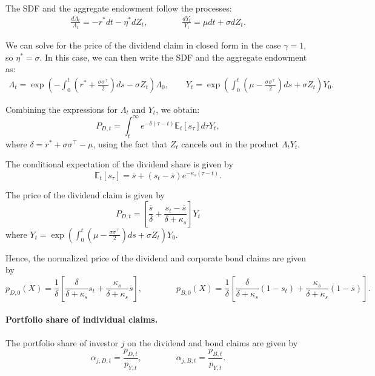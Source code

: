 The SDF and the aggregate endowment follow the processes:
\begin{align}
    \frac{d \Lambda_t}{\Lambda_t} = -r^* dt - \eta^* dZ_t, \qquad \qquad 
    \frac{d Y_t}{Y_t} = \mu dt + \sigma dZ_t.
\end{align}

We can solve for the price of the dividend claim in closed form in the case $\gamma = 1$, so $\eta^ * = \sigma$.
In this case, we can then write the SDF and the aggregate endowment as:
\begin{align}
    \Lambda_t = \exp\left( -\int_0^t \left( r^* + \frac{\sigma \sigma^\top}{2} \right) ds - \sigma Z_t \right) \Lambda_0, \qquad 
    Y_t = \exp\left( \int_0^t \left( \mu - \frac{\sigma \sigma^\top}{2} \right) ds + \sigma Z_t \right) Y_0.
\end{align}

Combining the expressions for $\Lambda_t$ and $Y_t$, we obtain:
\begin{equation}
    P_{D,t} = \int_t^\infty e^{-\delta (\tau-t)} \mathbb{E}_t\left[ s_\tau \right] d\tau Y_t,
\end{equation}
where $\delta = r^* +\sigma \sigma^\top- \mu $, using the fact that $Z_t$ cancels out in the product $\Lambda_t Y_t$.

The conditional expectation of the dividend share is given by
\begin{equation}
    \mathbb{E}_t\left[ s_\tau \right] = \overline{s} + (s_t - \overline{s}) e^{-\kappa_s (\tau-t)}.
\end{equation}

The price of the dividend claim is given by
\begin{equation}
    P_{D,t} = \left[ \frac{\overline{s}}{\delta} + \frac{s_t - \overline{s}}{\delta + \kappa_s} \right] Y_t
\end{equation}
where $Y_t = \exp\left( \int_0^t \left( \mu - \frac{\sigma \sigma^\top}{2} \right) ds + \sigma Z_t \right) Y_0$.

Hence, the normalized price of the dividend and corporate bond claims are given by
\begin{equation}
    p_{D,0}(X) = \frac{1}{\delta}\left[\frac{\delta}{\delta + \kappa_s} s_t + \frac{\kappa_s}{\delta+\kappa_s}  \overline{s}  \right], \qquad \qquad 
    p_{B,0}(X) = \frac{1}{\delta}\left[\frac{\delta}{\delta + \kappa_s} (1-s_t) + \frac{\kappa_s}{\delta+\kappa_s}  (1-\overline{s})  \right].
\end{equation}

\paragraph{Portfolio share of individual claims.}
The portfolio share of investor $j$ on the dividend and bond claims are given by
\begin{equation}
    \alpha_{j,D,t} = \frac{p_{D,t}}{p_{Y,t}}, \qquad \qquad 
    \alpha_{j,B,t} = \frac{p_{B,t}}{p_{Y,t}}.
\end{equation}

